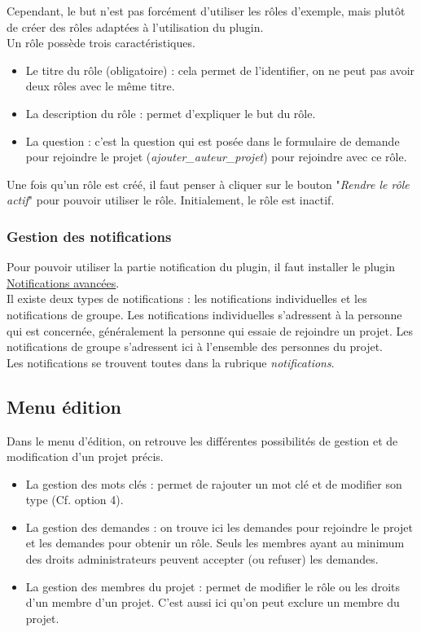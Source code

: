\vspace{0.5cm}

Cependant, le but n'est pas forcément d'utiliser les rôles d'exemple, mais plutôt de créer des rôles adaptées à l'utilisation du plugin.\\
\newline
Un rôle possède trois caractéristiques.
\begin{itemize}
    \item Le titre du rôle (obligatoire) : cela permet de l'identifier, on ne peut pas avoir deux rôles avec le même titre.
    \item La description du rôle : permet d'expliquer le but du rôle.
    \item La question : c'est la question qui est posée dans le formulaire de demande pour rejoindre le projet (\textit{ajouter\_auteur\_projet}) pour rejoindre avec ce rôle. 
\end{itemize}
Une fois qu'un rôle est créé, il faut penser à cliquer sur le bouton "\textit{Rendre le rôle actif}" pour pouvoir utiliser le rôle. Initialement, le rôle est inactif.

\subsubsection*{Gestion des notifications} \label{subsubsection:gestion-notifications}

Pour pouvoir utiliser la partie notification du plugin, il faut installer le plugin \href{https://plugins.spip.net/notifavancees.html}{Notifications avancées}.\\
\newline
Il existe deux types de notifications : les notifications individuelles et les notifications de groupe. Les notifications individuelles s'adressent à la personne qui est concernée, généralement la personne qui essaie de rejoindre un projet. Les notifications de groupe s'adressent ici à l'ensemble des personnes du projet.\\
\newline
Les notifications se trouvent toutes dans la rubrique \textit{notifications}.

\subsection{Menu édition} \label{subsection:menu-edition}

Dans le menu d'édition, on retrouve les différentes possibilités de gestion et de modification d'un projet précis.

\begin{itemize}
    \item La gestion des mots clés : permet de rajouter un mot clé et de modifier son type (Cf. option 4).
    \item La gestion des demandes : on trouve ici les demandes pour rejoindre le projet et les demandes pour obtenir un rôle. Seuls les membres ayant au minimum des droits administrateurs peuvent accepter (ou refuser) les demandes. 
    \item La gestion des membres du projet : permet de modifier le rôle ou les droits d'un membre d'un projet. C'est aussi ici qu'on peut exclure un membre du projet.
\end{itemize}
